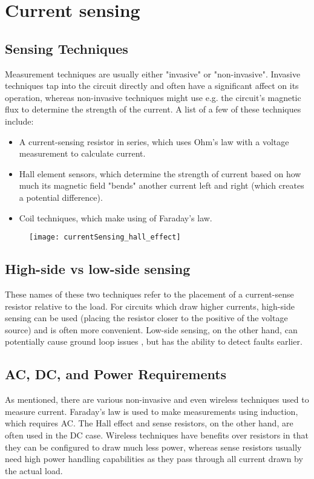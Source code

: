 \graphicspath{{content/1_literatureReview/figures/}}
\section{Current sensing}\label{sec:cursens}

\subsection{Sensing Techniques}\label{sec:cur_sum}
Measurement techniques are usually either "invasive" or "non-invasive". Invasive techniques tap into the circuit directly and often have a significant affect
on its operation, whereas non-invasive techniques might use e.g. the circuit's magnetic flux to determine the strength of the current.
A list of a few of these techniques \cite{currentSenseMethods} include:
\begin{itemize}
    \item A current-sensing resistor in series, which uses Ohm's law with a voltage measurement to calculate current.
    \item Hall element sensors, which determine the strength of current based on how much its magnetic field "bends" another current left and right (which creates a potential difference).
    \item Coil techniques, which make using of Faraday's law.
\end{itemize}

\begin{figure}[h!]
    \centering
    \texttt{[image: currentSensing\_hall\_effect]}
    \label{fig:hall-effect}
  \end{figure}

\subsection{High-side vs low-side sensing}\label{sec:cur_highlow}
These names of these two techniques refer to the placement of a current-sense resistor relative to the load. For circuits which draw higher currents, high-side sensing can be used
(placing the resistor closer to the positive of the voltage source) and is often more convenient. Low-side sensing, on the other hand, can potentially cause ground loop
issues \cite{currentSenseLowHighSide}, but has the ability to detect faults earlier.

\subsection{AC, DC, and Power Requirements}\label{sec:cur_acdc}
As mentioned, there are various non-invasive and even wireless techniques used to measure current. Faraday's law is used to make measurements using induction, which requires AC.
The Hall effect and sense resistors, on the other hand, are often used in the DC case. Wireless techniques have benefits over resistors in that they can be configured to draw much less power,
whereas sense resistors usually need high power handling capabilities as they pass through all current drawn by the actual load.
